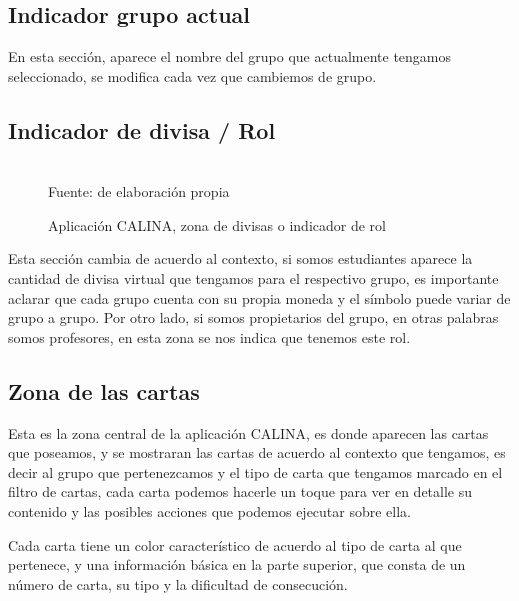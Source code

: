\subsection{Indicador grupo actual}

En esta sección, aparece el nombre del grupo que actualmente tengamos seleccionado, se modifica cada vez que 
cambiemos de grupo.

\subsection{Indicador de divisa / Rol}

\begin{figure}[!htb]
\caption[]{Aplicación CALINA, zona de divisas o indicador de rol}
\centering
{}
\hfill
{}
\\
{\footnotesize Fuente: de elaboración propia}
\end{figure}

Esta sección cambia de acuerdo al contexto, si somos estudiantes aparece la cantidad de divisa virtual que 
tengamos para el respectivo grupo, es importante aclarar que cada grupo cuenta con su propia moneda y el 
símbolo puede variar de grupo a grupo. Por otro lado, si somos propietarios del grupo, en otras palabras somos 
profesores, en esta zona se nos indica que tenemos este rol.

\subsection{Zona de las cartas}

Esta es la zona central de la aplicación CALINA, es donde aparecen las cartas que poseamos, y se mostraran las 
cartas de acuerdo al contexto que tengamos, es decir al grupo que pertenezcamos y el tipo de carta que 
tengamos marcado en el filtro de cartas, cada carta podemos hacerle un toque para ver en detalle su contenido 
y las posibles acciones que podemos ejecutar sobre ella.

Cada carta tiene un color característico de acuerdo al tipo de carta al que pertenece, y una información 
básica en la parte superior, que consta de un número de carta, su tipo y la dificultad de consecución.

